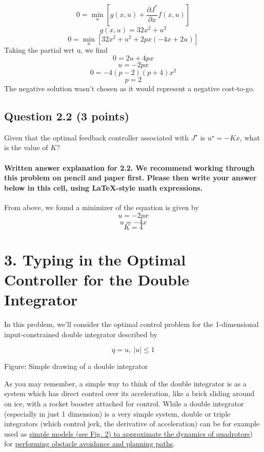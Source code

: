 \documentclass[11pt]{article}
\begin{document}
\[ 0 = \min_u \left[ g(x,u) + \frac{\partial J^*}{\partial x} f(x,u) \right] \]
\[ g(x,u) = 32x^2 + u^2 \]
\[ 0 = \min_u \left[ 32x^2 + u^2 + 2px (-4x + 2u) \right] \] Taking the
partial wrt u, we find \[ 0 = 2 u + 4 p x \] \[ u = -2 p x \]
\[ 0 = -4 (p-2) (p+4) x^2 \] \[ p = 2\] The negative solution wasn't
chosen as it would represent a negative cost-to-go.

    \subsection{Question 2.2 (3 points)}\label{question-2.2-3-points}

Given that the optimal feedback controller associated with \(J^\star\)
is \(u^\star = -Kx\), what is the value of \(K\)?

    \paragraph{Written answer explanation for 2.2. We recommend working
through this problem on pencil and paper first. Please then write your
answer below in this cell, using LaTeX-style math
expressions.}\label{written-answer-explanation-for-2.2.-we-recommend-working-through-this-problem-on-pencil-and-paper-first.-please-then-write-your-answer-below-in-this-cell-using-latex-style-math-expressions.}

From above, we found a minimizer of the equation is given by
\[ u = -2 p x\] \[ u = -4 x\] \[ K = 4\]

    \section{3. Typing in the Optimal Controller for the Double
Integrator}\label{typing-in-the-optimal-controller-for-the-double-integrator}

In this problem, we'll consider the optimal control problem for the
1-dimensional input-constrained double integrator described by

\[
\ddot{q} = u, \ |u| \leq 1
\]

Figure: Simple drawing of a double integrator

As you may remember, a simple way to think of the double integrator is
as a system which has direct control over its acceleration, like a brick
sliding around on ice, with a rocket booster attached for control. While
a double integrator (especially in just 1 dimension) is a very simple
system, double or triple integrators (which control jerk, the derivative
of acceleration) can be for example used as
\href{http://groups.csail.mit.edu/robotics-center/public_papers/Florence16.pdf}{simple
models (see Fig. 2) to approximate the dynamics of quadrotors}) for
\href{https://www.youtube.com/watch?v=9a0eEscz1Cs\&t=1s}{performing
obstacle avoidance and planning paths}.
\end{document}
